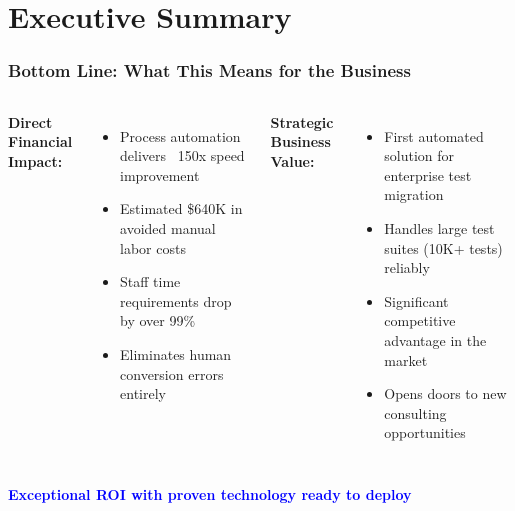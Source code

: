 
\section{Executive Summary}
\begin{frame}
\frametitle{Bottom Line: What This Means for the Business}
\begin{columns}
\textbf{Direct Financial Impact:}
\begin{itemize}
    \item Process automation delivers ~150x speed improvement
    \item Estimated \$640K in avoided manual labor costs
    \item Staff time requirements drop by over 99\%
    \item Eliminates human conversion errors entirely
\end{itemize}

\textbf{Strategic Business Value:}
\begin{itemize}
    \item First automated solution for enterprise test migration
    \item Handles large test suites (10K+ tests) reliably
    \item Significant competitive advantage in the market
    \item Opens doors to new consulting opportunities
\end{itemize}
\end{columns}

\vspace{0.3cm}
\begin{center}
\textcolor{blue}{\textbf{Exceptional ROI with proven technology ready to deploy}}
\end{center}
\end{frame}


